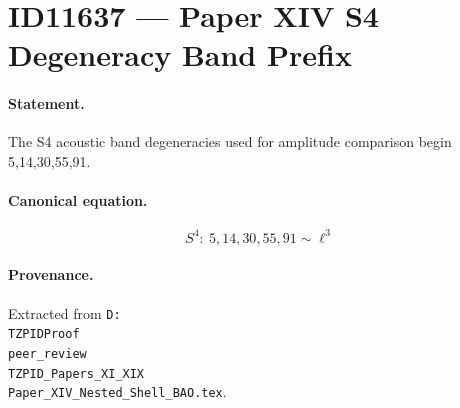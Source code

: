 \section*{ID11637 --- Paper XIV S4 Degeneracy Band Prefix}

\paragraph{Statement.}
The S4 acoustic band degeneracies used for amplitude comparison begin 5,14,30,55,91.

\paragraph{Canonical equation.}
\[
S^4:\ 5,14,30,55,91\sim\ell^3
\]

\paragraph{Provenance.}
Extracted from \texttt{D:\\TZPIDProof\\peer\_review\\TZPID\_Papers\_XI\_XIX\\Paper\_XIV\_Nested\_Shell\_BAO.tex}.
